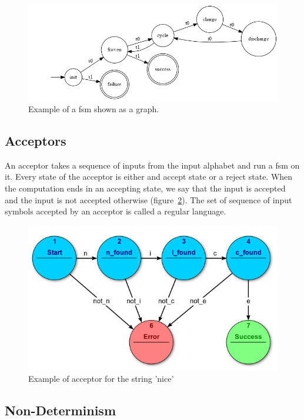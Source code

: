 \documentclass[12pt]{article}
\theoremstyle{definition}
\theoremstyle{definition}
\begin{document}
\begin{figure}
    \centering
    \includegraphics[scale=0.4]{graph/BatteryCycle.png}
    \caption{Example of a \gls{fsm} shown as a graph.}
    \label{battcycle}
\end{figure}

\subsection{Acceptors}

An acceptor takes a sequence of inputs from the input alphabet and run a \gls{fsm} on it. Every state of the acceptor is either and accept state or a reject state. When the computation ends in an accepting state, we say that the input is accepted and the input is not accepted otherwise (figure~\ref{acceptor}). The set of sequence of input symbols accepted by an acceptor is called a regular language.\\

\begin{figure}
    \centering
    \includegraphics[scale=0.8]{acceptor.png}
    \caption{Example of acceptor for the string 'nice'~\cite{FSM:2017}}
    \label{acceptor}
\end{figure}

\subsection{Non-Determinism}
\end{document}
